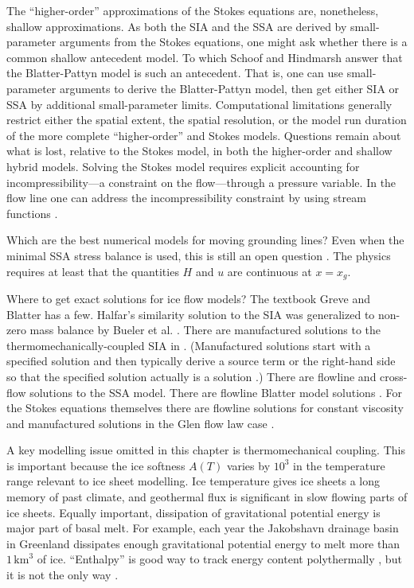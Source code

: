 \documentclass[titlepage,a4paper,final,12pt]{scrartcl}
\begin{document}
The ``higher-order'' approximations of the Stokes equations \cite{Blatter,Pattyn03} are, nonetheless, shallow approximations.  As both the SIA and the SSA are derived by small-parameter arguments from the Stokes equations, one might ask whether there is a common shallow antecedent model.  To which Schoof and Hindmarsh \cite{SchoofHindmarsh} answer that the Blatter-Pattyn model \cite{Blatter,Pattyn03} is such an antecedent.  That is, one can use small-parameter arguments to derive the Blatter-Pattyn model, then get either SIA or SSA by additional small-parameter limits.  Computational limitations generally restrict either the spatial extent, the spatial resolution, or the model run duration of the more complete ``higher-order'' and Stokes models.  Questions remain about what is lost, relative to the Stokes model, in both the higher-order \cite{ISMIPHOM} and shallow hybrid models.  Solving the Stokes model requires explicit accounting for incompressibility---a constraint on the flow---through a pressure variable.  In the flow line one can address the incompressibility constraint by using stream functions \cite{BaliseRaymond1985}.

Which are the best numerical models for moving grounding lines?  Even when the minimal SSA stress balance is used, this is still an open question \cite{Goldbergetal2009,SchoofMarine1}.  The physics requires at least that the quantities $H$ and $u$ are continuous at $x=x_g$.

Where to get exact solutions for ice flow models?  The textbook Greve and Blatter \cite{GreveBlatter2009} has a few.  Halfar's similarity solution to the SIA \cite{Halfar81,Halfar83} was generalized to non-zero mass balance by Bueler et al. \cite{BLKCB}.  There are manufactured solutions to the thermomechanically-coupled SIA in  \cite{BBL}.  (Manufactured solutions start with a specified solution and then typically derive a source term or the right-hand side  so that the specified solution actually is a solution \cite{Roache}.)  There are flowline \cite{vanderVeen83} and cross-flow \cite{SchoofStream} solutions to the SSA model.  There are flowline Blatter model solutions \cite{GlowinskiRappaz}.  For the Stokes equations themselves there are flowline solutions for constant viscosity \cite{BaliseRaymond1985} and manufactured solutions in the Glen flow law case \cite{JouvetRappaz2011,SargentFastook2010}.

A key modelling issue omitted in this chapter is thermomechanical coupling.  This is important because the ice softness $A(T)$ varies by $10^3$ in the temperature range relevant to ice sheet modelling.  Ice temperature gives ice sheets a long memory of past climate, and geothermal flux is significant in slow flowing parts of ice sheets.  Equally important, dissipation of gravitational potential energy is major part of basal melt.  For example, each year the Jakobshavn drainage basin in Greenland dissipates enough gravitational potential energy to melt more than $1\,\text{km}^3$ of ice.  ``Enthalpy'' is good way to track energy content polythermally \cite{AschwandenBuelerKhroulevBlatter}, but it is not the only way \cite{Greve}.
\end{document}

